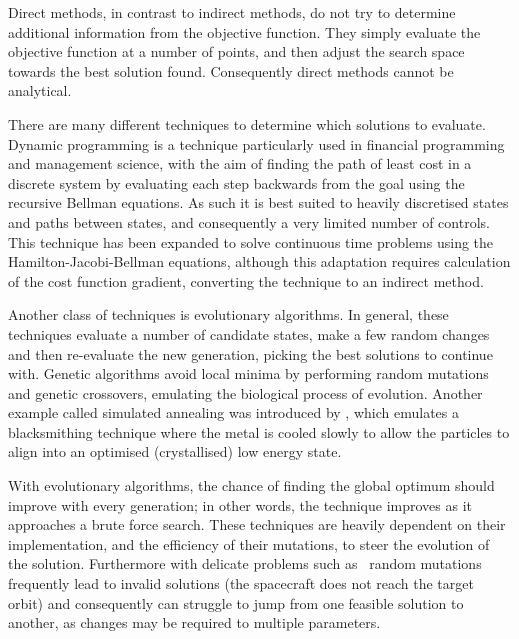 Direct methods, in contrast to indirect methods, do not try to determine additional information from the objective function. They simply evaluate the objective function at a number of points, and then adjust the search space towards the best solution found. Consequently direct methods cannot be analytical. %

There are many different techniques to determine which solutions to evaluate. Dynamic programming is a technique particularly used in financial programming and management science, with the aim of finding the path of least cost in a discrete system by evaluating each step backwards from the goal using the recursive Bellman equations. As such it is best suited to heavily discretised states and paths between states, and consequently a very limited number of controls. This technique has been expanded to solve continuous time problems using the Hamilton-Jacobi-Bellman equations, although this adaptation requires calculation of the cost function gradient, converting the technique to an indirect method. 

Another class of techniques is evolutionary algorithms. In general, these techniques evaluate a number of candidate states, make a few random changes and then re-evaluate the new generation, picking the best solutions to continue with. Genetic algorithms avoid local minima by performing random mutations and genetic crossovers, emulating the biological process of evolution. Another example called simulated annealing was introduced by \textcite{Kirkpatrick1983}, which emulates a blacksmithing technique where the metal is cooled slowly to allow the particles to align into an optimised (crystallised) low energy state. 

With evolutionary algorithms, the chance of finding the global optimum should improve with every generation; in other words, the technique improves as it approaches a brute force search. These techniques are heavily dependent on their implementation, and the efficiency of their mutations, to steer the evolution of the solution. Furthermore with delicate problems such as \BW\ random mutations frequently lead to invalid solutions (the spacecraft does not reach the target orbit) and consequently can struggle to jump from one feasible solution to another, as changes may be required to multiple parameters.



